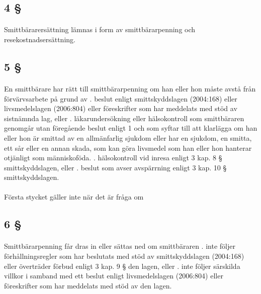 \documentclass[a4paper,notitlepage,openany,10pt]{book}
\begin{document}
\subsection*{4 §}
\paragraph*{}
Smittbärarersättning lämnas i form av smittbärarpenning och resekostnadsersättning.
\subsection*{5 §}
\paragraph*{}
En smittbärare har rätt till smittbärarpenning om han eller hon måste avstå från förvärvsarbete på grund av
. beslut enligt smittskyddslagen (2004:168) eller livsmedelslagen (2006:804) eller föreskrifter som har meddelats med stöd av sistnämnda lag, eller
. läkarundersökning eller hälsokontroll som smittbäraren genomgår utan föregående beslut enligt 1 och som syftar till att klarlägga om han eller hon är smittad av en allmänfarlig sjukdom eller har en sjukdom, en smitta, ett sår eller en annan skada, som kan göra livsmedel som han eller hon hanterar otjänligt som människoföda.
. hälsokontroll vid inresa enligt 3 kap. 8 § smittskyddslagen, eller
. beslut som avser avspärrning enligt 3 kap. 10 § smittskyddslagen.
\paragraph*{}
Första stycket gäller inte när det är fråga om
\subsection*{6 §}
\paragraph*{}
Smittbärarpenning får dras in eller sättas ned om smittbäraren
. inte följer förhållningsregler som har beslutats med stöd av smittskyddslagen (2004:168) eller överträder förbud enligt 3 kap. 9 § den lagen, eller
. inte följer särskilda villkor i samband med ett beslut enligt livsmedelslagen (2006:804) eller föreskrifter som har meddelats med stöd av den lagen.
\end{document}
